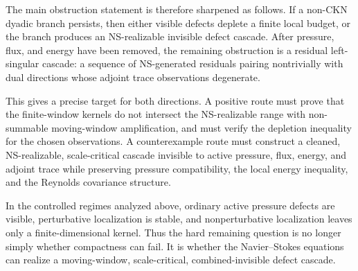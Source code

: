\documentclass[11pt]{article}
\numberwithin{equation}{section}
\theoremstyle{plain}
\theoremstyle{definition}
\theoremstyle{remark}
\begin{document}
The main obstruction statement is therefore sharpened as follows.  If a non-CKN dyadic branch persists, then either visible defects deplete a finite local budget, or the branch produces an NS-realizable invisible defect cascade.  After pressure, flux, and energy have been removed, the remaining obstruction is a residual left-singular cascade: a sequence of NS-generated residuals pairing nontrivially with dual directions whose adjoint trace observations degenerate.

This gives a precise target for both directions.  A positive route must prove that the finite-window kernels do not intersect the NS-realizable range with non-summable moving-window amplification, and must verify the depletion inequality for the chosen observations.  A counterexample route must construct a cleaned, NS-realizable, scale-critical cascade invisible to active pressure, flux, energy, and adjoint trace while preserving pressure compatibility, the local energy inequality, and the Reynolds covariance structure.

In the controlled regimes analyzed above, ordinary active pressure defects are visible, perturbative localization is stable, and nonperturbative localization leaves only a finite-dimensional kernel.  Thus the hard remaining question is no longer simply whether compactness can fail.  It is whether the Navier--Stokes equations can realize a moving-window, scale-critical, combined-invisible defect cascade.
\end{document}
